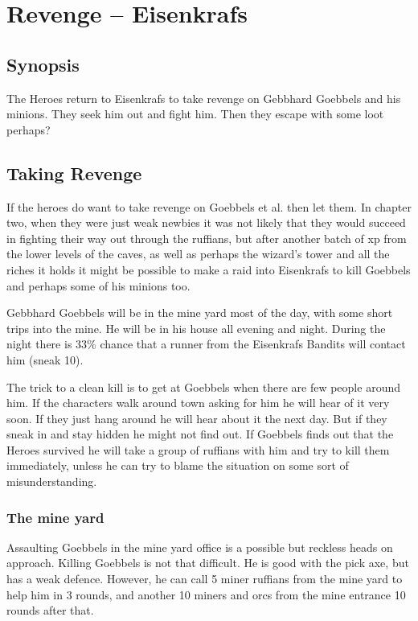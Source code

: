 \documentclass[11pt, twoside, titlepage, a4paper]{report}
\renewcommand{\chaptermark}[1]{\markboth{#1}{}}
\begin{document}

\clearpage
{}
\section*{Revenge -- Eisenkrafs}
\chaptermark{revenge in eisenkrafs}


\subsection*{Synopsis}
The Heroes return to Eisenkrafs to take revenge on Gebbhard Goebbels and his minions. They seek him out and fight him. Then they escape with some loot perhaps?


\subsection*{Taking Revenge}
If the heroes do want to take revenge on Goebbels et al. then let them. In chapter two, when they were just weak newbies it was not likely that they would succeed in fighting their way out through the ruffians, but after another batch of xp from the lower levels of the caves, as well as perhaps the wizard's tower and all the riches it holds it might be possible to make a raid into Eisenkrafs to kill Goebbels and perhaps some of his minions too.

Gebbhard Goebbels will be in the mine yard most of the day, with some short trips into the mine. He will be in his house all evening and night. During the night there is 33\% chance that a runner from the Eisenkrafs Bandits will contact him (sneak 10).

The trick to a clean kill is to get at Goebbels when there are few people around him. If the characters walk around town asking for him he will hear of it very soon. If they just hang around he will hear about it the next day. But if they sneak in and stay hidden he might not find out. If Goebbels finds out that the Heroes survived he will take a group of ruffians with him and try to kill them immediately, unless he can try to blame the situation on some sort of misunderstanding.


\subsubsection*{The mine yard}
Assaulting Goebbels in the mine yard office is a possible but reckless heads on approach. Killing Goebbels is not that difficult. He is good with the pick axe, but has a weak defence. However, he can call 5 miner ruffians from the mine yard to help him in 3 rounds, and another 10 miners and orcs from the mine entrance 10 rounds after that.
\end{document}
